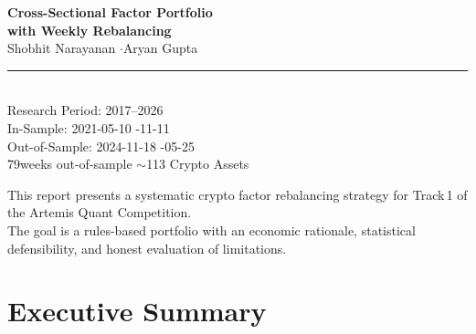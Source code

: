 \documentclass[11pt,a4paper]{article}
\begin{document}
\begin{titlepage}
\vspace{4cm}
\begin{center}
  {\LARGE\bfseries\color{beigetitle} Cross-Sectional Factor Portfolio\\[8pt] with Weekly Rebalancing}\\[24pt]
  {\large\color{beigeaccent} Shobhit Narayanan \quad$\cdot$\quad Aryan Gupta}\\[36pt]
  {\color{rulecolor}\rule{0.4\textwidth}{0.6pt}}\\[12pt]
  {\small\color{beigeaccent} Research Period: 2017--2026\\[3pt]
  In-Sample: 2021-05-10 \;\textendash{}-11-11\\[3pt]
  Out-of-Sample: 2024-11-18 \;\textendash{}-05-25\\[3pt]
  79\;weeks out-of-sample \;\textendash\; $\sim$113 Crypto Assets}
\end{center}
\vfill
\begin{center}
  {\footnotesize\color{beigeaccent} This report presents a systematic crypto factor rebalancing strategy for Track\,1 of the Artemis Quant Competition.\\[2pt]
  The goal is a rules-based portfolio with an economic rationale, statistical defensibility, and honest evaluation of limitations.}
\end{center}
\end{titlepage}

\newpage
\setcounter{page}{2}
{\small\tableofcontents}
\newpage

\section{Executive Summary}
\end{document}
